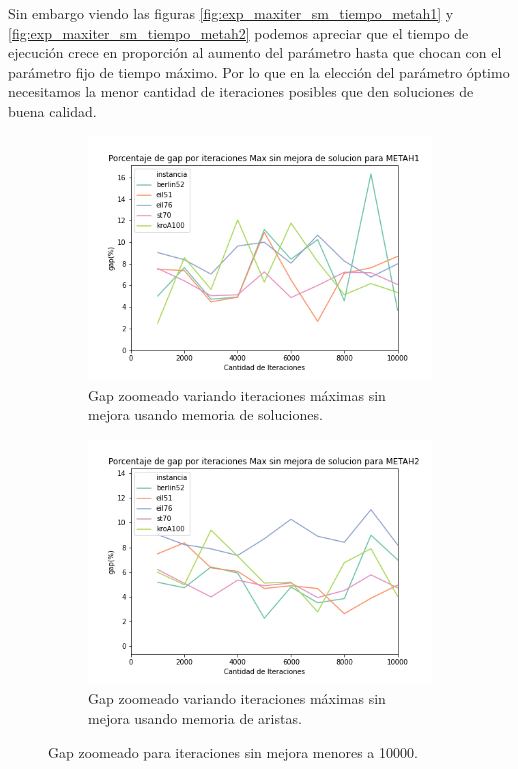 \documentclass[10pt,a4paper]{article}
\begin{document}
Sin embargo viendo las figuras \ref{fig:exp_maxiter_sm_tiempo_metah1} y \ref{fig:exp_maxiter_sm_tiempo_metah2} podemos apreciar que el tiempo de ejecución crece en proporción al aumento del parámetro hasta que chocan con el parámetro fijo de tiempo máximo. Por lo que en la elección del parámetro óptimo necesitamos la menor cantidad de iteraciones posibles que den soluciones de buena calidad.

\begin{figure}[h!]
    \centering
    \captionsetup{justification=centering}
    \begin{subfigure}{0.45\linewidth}
        \centering
        \includegraphics[scale=0.35]{Graphs-metaH/max-iter-sm-gap-METAH1-zoomed.png}
        \caption{Gap zoomeado variando iteraciones máximas sin mejora usando memoria de soluciones.}
        \label{fig:exp_maxiter_sm_gap_zoom_metah1}
    \end{subfigure}
    \begin{subfigure}{0.45\linewidth}
        \centering
        \includegraphics[scale=0.35]{Graphs-metaH/max-iter-sm-gap-METAH2-zoomed.png}
        \caption{Gap zoomeado variando iteraciones máximas sin mejora usando memoria de aristas.}
        \label{fig:exp_maxiter_sm_gap_zoom_metah2}
    \end{subfigure}
    \caption{Gap zoomeado para iteraciones sin mejora menores a 10000.}
\end{figure}
\end{document}
